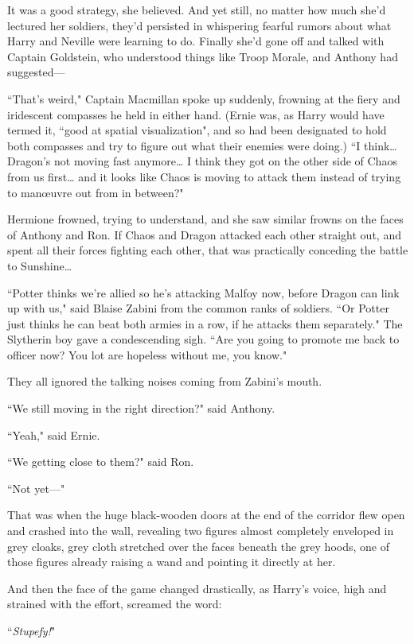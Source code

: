 It was a good strategy, she believed. And yet still, no matter how much she'd lectured her soldiers, they'd persisted in whispering fearful rumors about what Harry and Neville were learning to do. Finally she'd gone off and talked with Captain Goldstein, who understood things like Troop Morale, and Anthony had suggested—

``That's weird," Captain Macmillan spoke up suddenly, frowning at the fiery and iridescent compasses he held in either hand. (Ernie was, as Harry would have termed it, ``good at spatial visualization", and so had been designated to hold both compasses and try to figure out what their enemies were doing.) ``I think{\ldots} Dragon's not moving fast anymore{\ldots} I think they got on the other side of Chaos from us first{\ldots} and it looks like Chaos is moving to attack them instead of trying to manœuvre out from in between?"

Hermione frowned, trying to understand, and she saw similar frowns on the faces of Anthony and Ron. If Chaos and Dragon attacked each other straight out, and spent all their forces fighting each other, that was practically conceding the battle to Sunshine{\ldots}

``Potter thinks we're allied so he's attacking Malfoy now, before Dragon can link up with us," said Blaise Zabini from the common ranks of soldiers. ``Or Potter just thinks he can beat both armies in a row, if he attacks them separately." The Slytherin boy gave a condescending sigh. ``Are you going to promote me back to officer now? You lot are hopeless without me, you know."

They all ignored the talking noises coming from Zabini's mouth.

``We still moving in the right direction?" said Anthony.

``Yeah," said Ernie.

``We getting close to them?" said Ron.

``Not yet—"

That was when the huge black-wooden doors at the end of the corridor flew open and crashed into the wall, revealing two figures almost completely enveloped in grey cloaks, grey cloth stretched over the faces beneath the grey hoods, one of those figures already raising a wand and pointing it directly at her.

And then the face of the game changed drastically, as Harry's voice, high and strained with the effort, screamed the word:

``\emph{Stupefy!}"

